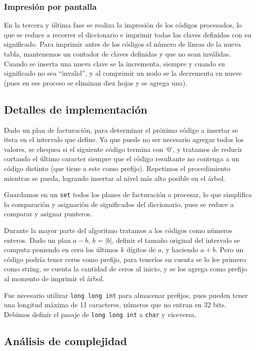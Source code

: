 \subsubsection*{Impresión por pantalla}

En la tercera y última fase se realiza la impresión de los códigos procesados,
lo que se reduce a recorrer el diccionario e imprimir todas las claves definidas
con su significado.
Para imprimir antes de los códigos el número de líneas de la nueva tabla,
mantenemos un contador de claves definidas y que no sean inválidas.
Cuando se inserta una nueva clave se la incrementa, siempre y cuando su significado
no sea ``invalid'', y al comprimir un nodo se la decrementa en nueve
(pues en ese proceso se eliminan diez hojas y se agrega una).

\subsection*{Detalles de implementación}

Dado un plan de facturación, para determinar el próximo código a insertar se
itera en el intervalo que define. Ya que puede no ser necesario agregar todos
los valores, se chequea si el siguiente código termina con `0', y tratamos
de reducir cortando el último caracter siempre que el código resultante no
contenga a un código distinto (que tiene a este como prefijo). Repetimos el
procedimiento mientras se pueda, logrando insertar al nivel más alto posible en
el árbol.

Guardamos en un {\tt set} todos los planes de facturación a procesar, lo que
simplifica la comparación y asignación de significados del diccionario,
pues se reduce a comparar y asignar punteros.

Durante la mayor parte del algoritmo tratamos a los códigos como números
enteros. Dado un plan $a-b$, $k=|b|$, definir el tamaño original del
intervalo se computa poniendo en cero los últimos $k$ dígitos de $a$,
y haciendo $a+b$. Pero un código podría tener ceros como prefijo, para
tenerlos en cuenta se lo lee primero como string, se cuenta la cantidad de
ceros al inicio, y se los agrega como prefijo al momento de imprimir el árbol.

Fue necesario utilizar {\tt long long int} para almacenar prefijos,
pues pueden tener una longitud máxima de 11 caracteres, números que no
entran en 32 bits. Debimos definir el pasaje de {\tt long long int} a {\tt char}
y viceversa.

\subsection*{Análisis de complejidad}

